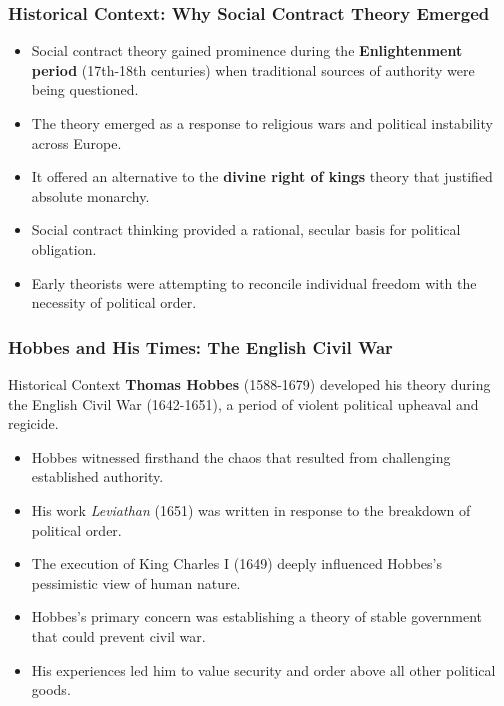 \documentclass[aspectratio=169]{beamer}
\begin{document}
\begin{frame}
  \frametitle{Historical Context: Why Social Contract Theory Emerged}
  
  \begin{itemize}
    \item Social contract theory gained prominence during the \textbf{Enlightenment period} (17th-18th centuries) when traditional sources of authority were being questioned.
    \item The theory emerged as a response to religious wars and political instability across Europe.
    \item It offered an alternative to the \textbf{divine right of kings} theory that justified absolute monarchy.
    \item Social contract thinking provided a rational, secular basis for political obligation.
    \item Early theorists were attempting to reconcile individual freedom with the necessity of political order.
  \end{itemize}
\end{frame}

\begin{frame}
  \frametitle{Hobbes and His Times: The English Civil War}
  
  \begin{block}{Historical Context}
    \textbf{Thomas Hobbes} (1588-1679) developed his theory during the English Civil War (1642-1651), a period of violent political upheaval and regicide.
  \end{block}
  
  \begin{itemize}
    \item Hobbes witnessed firsthand the chaos that resulted from challenging established authority.
    \item His work \textit{Leviathan} (1651) was written in response to the breakdown of political order.
    \item The execution of King Charles I (1649) deeply influenced Hobbes's pessimistic view of human nature.
    \item Hobbes's primary concern was establishing a theory of stable government that could prevent civil war.
    \item His experiences led him to value security and order above all other political goods.
  \end{itemize}
\end{frame}
\end{document}
